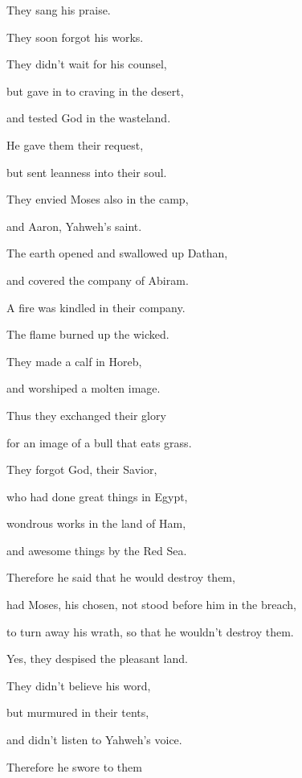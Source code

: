 {\par }{\QB They sang his praise.
\par }{\BB \par }{\Q {}They soon forgot his works.
\par }{\QB They didn’t wait for his counsel,
\par }{\QB {}but gave in to craving in the desert,
\par }{\QB and tested God in the wasteland.
\par }{\Q {}He gave them their request,
\par }{\QB but sent leanness into their soul.
\par }{\Q {}They envied Moses also in the camp,
\par }{\QB and Aaron, Yahweh’s saint.
\par }{\Q {}The earth opened and swallowed up Dathan,
\par }{\QB and covered the company of Abiram.
\par }{\Q {}A fire was kindled in their company.
\par }{\QB The flame burned up the wicked.
\par }{\Q {}They made a calf in Horeb,
\par }{\QB and worshiped a molten image.
\par }{\Q {}Thus they exchanged their glory
\par }{\QB for an image of a bull that eats grass.
\par }{\Q {}They forgot God, their Savior,
\par }{\QB who had done great things in Egypt,
\par }{\QB {}wondrous works in the land of Ham,
\par }{\QB and awesome things by the Red Sea.
\par }{\Q {}Therefore he said that he would destroy them,
\par }{\QB had Moses, his chosen, not stood before him in the breach,
\par }{\QB to turn away his wrath, so that he wouldn’t destroy them.
\par }{\Q {}Yes, they despised the pleasant land.
\par }{\QB They didn’t believe his word,
\par }{\QB {}but murmured in their tents,
\par }{\QB and didn’t listen to Yahweh’s voice.
\par }{\Q {}Therefore he swore to them
}
